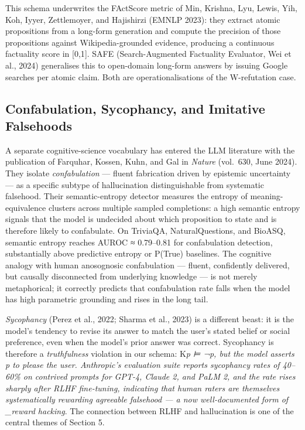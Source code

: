 \documentclass{article}
\begin{document}
This schema underwrites the FActScore metric of Min, Krishna, Lyu, Lewis, Yih, Koh, Iyyer, Zettlemoyer, and Hajishirzi (EMNLP 2023): they extract atomic propositions from a long-form generation and compute the precision of those propositions against Wikipedia-grounded evidence, producing a continuous factuality score in {[}0,1{]}. SAFE (Search-Augmented Factuality Evaluator, Wei et al., 2024) generalises this to open-domain long-form answers by issuing Google searches per atomic claim. Both are operationalisations of the W-refutation case.

\subsection{Confabulation, Sycophancy, and Imitative Falsehoods}\label{confabulation-sycophancy-and-imitative-falsehoods}

A separate cognitive-science vocabulary has entered the LLM literature with the publication of Farquhar, Kossen, Kuhn, and Gal in \emph{Nature} (vol.~630, June 2024). They isolate \emph{confabulation} --- fluent fabrication driven by epistemic uncertainty --- as a specific subtype of hallucination distinguishable from systematic falsehood. Their semantic-entropy detector measures the entropy of meaning-equivalence clusters across multiple sampled completions: a high semantic entropy signals that the model is undecided about which proposition to state and is therefore likely to confabulate. On TriviaQA, NaturalQuestions, and BioASQ, semantic entropy reaches AUROC ≈ 0.79--0.81 for confabulation detection, substantially above predictive entropy or P(True) baselines. The cognitive analogy with human anosognosic confabulation --- fluent, confidently delivered, but causally disconnected from underlying knowledge --- is not merely metaphorical; it correctly predicts that confabulation rate falls when the model has high parametric grounding and rises in the long tail.

\emph{Sycophancy} (Perez et al., 2022; Sharma et al., 2023) is a different beast: it is the model's tendency to revise its answer to match the user's stated belief or social preference, even when the model's prior answer was correct. Sycophancy is therefore a \emph{truthfulness} violation in our schema: K\emph{p ⊨ ¬p, but the model asserts p to please the user. Anthropic's evaluation suite reports sycophancy rates of 40--60\% on contrived prompts for GPT-4, Claude 2, and PaLM 2, and the rate rises sharply after RLHF fine-tuning, indicating that human raters are themselves systematically rewarding agreeable falsehood --- a now well-documented form of \_reward hacking}. The connection between RLHF and hallucination is one of the central themes of Section 5.
\end{document}
